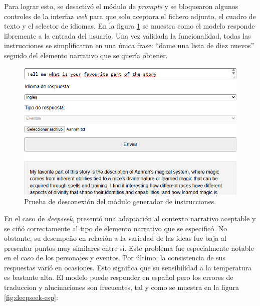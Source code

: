 Para lograr esto, se desactivó el módulo de \textit{prompts} y se bloquearon algunos controles de la interfaz
\textit{web} para que solo aceptara el fichero adjunto, el cuadro de texto y el selector de idiomas.
En la figura \ref{fig:prompt-test} se muestra
como el modelo responde libremente a la entrada del usuario.
Una vez validada la funcionalidad, todas las instrucciones se simplificaron en una única frase:
``dame una lista de diez nuevos'' seguido del elemento narrativo que se quería obtener.
\pagebreak
\begin{figure}[htbp]
	\centering
	\includegraphics[width=1\textwidth]{./Figures/promp-testing.png}
	\caption{Prueba de desconexión del módulo generador de instrucciones.}
	\label{fig:prompt-test}
\end{figure}

En el caso de \textit{deepseek}, presentó una adaptación al contexto narrativo aceptable y se ciñó correctamente al
tipo de elemento narrativo que se especificó.
No obstante, su desempeño en relación a la variedad de las ideas fue baja al presentar puntos muy similares entre sí.
Este problema fue especialmente notable en el caso de los personajes y eventos.
Por último, la consistencia de sus respuestas varió en ocasiones.
Esto significa que su sensibilidad a la temperatura es bastante alta.
El modelo puede responder en español pero los errores de traduccion y alucinaciones son frecuentes,
tal y como se muestra en la figura \ref{fig:deepseek-esp}:


